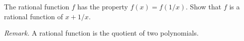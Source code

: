 The rational function $f$ has the property $f(x) = f(1/x)$. Show that $f$ is a rational function of $x + 1/x$.

\emph{Remark.} A rational function is the quotient of two polynomials.
